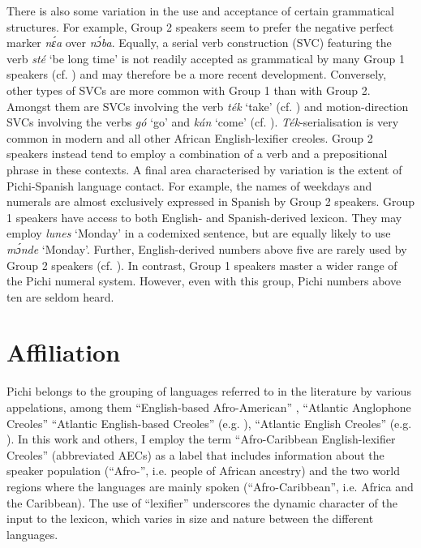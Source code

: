 \addtocounter{equation}{11}

\bigskip
There is also some variation in the use and acceptance of certain grammatical structures. For example, Group 2 speakers seem to prefer the negative perfect marker \textit{nɛ́a} over \textit{nɔ́ba}. Equally, a serial verb construction (SVC) featuring the verb \textit{sté} ‘be long time’ is not readily accepted as grammatical by many Group 1 speakers (cf. ) and may therefore be a more recent development. Conversely, other types of SVCs are more common with Group 1 than with Group 2. Amongst them are SVCs involving the verb \textit{ték} ‘take’ (cf. ) and motion-direction SVCs involving the verbs \textit{gó} ‘go’ and \textit{kán} ‘come’ (cf. ). \textit{Ték}-serialisation is very common in modern  and all other African English-lexifier creoles. Group 2 speakers instead tend to employ a combination of a verb and a prepositional phrase in these contexts. A final area characterised by variation is the extent of Pichi-Spanish language contact. For example, the names of weekdays and numerals are almost exclusively expressed in Spanish by Group 2 speakers. Group 1 speakers have access to both English- and Spanish-derived lexicon. They may employ \textit{lunes} ‘Monday’ in a codemixed sentence, but are equally likely to use \textit{mɔ́nde} ‘Monday’. Further, English-derived numbers above five are rarely used by Group 2 speakers (cf. ). In contrast, Group 1 speakers master a wider range of the Pichi numeral system. However, even with this group, Pichi numbers above ten are seldom heard.

\section{Affiliation}\label{sec:1.4}
\largerpage
Pichi belongs to the grouping of languages referred to in the literature by various appelations, among them “English-based Afro-American” \citep{Alleyne1980}, “Atlantic Anglophone Creoles” \citep{Hancock1986,Hancock1987} “Atlantic English-based Creoles” (e.g. \citealt{MuyskenSmith1990}), “Atlantic English Creoles” (e.g. \citealt{Baker1999}). In this work and others, I employ the term “Afro-Caribbean English-lexifier Creoles” (abbreviated AECs) \citep{Faraclas2004} as a label that includes information about the speaker population (\mbox{“Afro-”}, i.e. people of African ancestry) and the two world regions where the languages are mainly spoken (“Afro-Caribbean”, i.e. Africa and the Caribbean). The use of “lexifier” underscores the dynamic character of the  input to the lexicon, which varies in size and nature between the different languages. 


